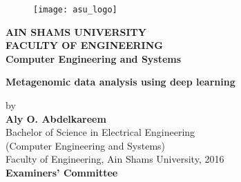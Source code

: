 \newpage
\thispagestyle{empty}
\newlength{\thenamewidth}
\newlength{\thesignaturewidth}
\newlength{\nameskip}

\setlength{\thenamewidth}{8cm}
\setlength{\thesignaturewidth}{4cm}
\setlength{\nameskip}{0.8cm}


 \begin{center}
\begin{figure}
  \begin{center}
    \texttt{[image: asu\_logo]}
  \end{center}
\end{figure}
\small


\textbf{AIN SHAMS UNIVERSITY\\
	FACULTY OF ENGINEERING\\
	Computer Engineering and Systems}



\vfill
\Large
\textbf{Metagenomic data analysis using deep learning} \\ 

\vfill
\small

by\\
\large
\textbf{Aly O. Abdelkareem}\\
\small
Bachelor of Science in Electrical Engineering  \\
(Computer Engineering and Systems)\\
Faculty of Engineering, Ain Shams University, 2016\\










\vspace{3em}
\textbf{Examiners' Committee}

\end{center} 

